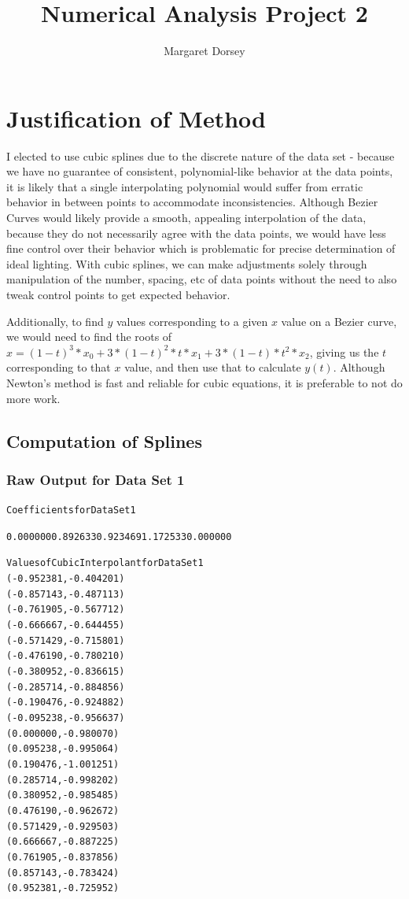 \documentclass[11pt]{article} %
\title{Numerical Analysis Project 2}
\author{Margaret Dorsey}
\begin{document}
\maketitle

\section*{Justification of Method}
	I elected to use cubic splines due to the discrete nature of the data set - because we have no guarantee of consistent, polynomial-like behavior at the data points, it is likely that a single interpolating polynomial would suffer from erratic behavior in between points to accommodate inconsistencies. Although Bezier Curves would likely provide a smooth, appealing interpolation of the data, because they do not necessarily agree with the data points, we would have less fine control over their behavior which is problematic for precise determination of ideal lighting. With  cubic splines, we can make adjustments solely through manipulation of the number, spacing, etc of data points without the need to also tweak control points to get expected behavior.
\par Additionally, to find $y$ values corresponding to a given $x$ value on a Bezier curve, we would need to find the roots of $x = (1-t)^3*x_0 + 3*(1-t)^2*t*x_1 + 3*(1-t)*t^2*x_2$, giving us the $t$ corresponding to that $x$ value, and then use that to calculate $y(t)$. Although Newton's method is fast and reliable for cubic equations, it is preferable to not do more work.

\subsection*{Computation of Splines}
\subsubsection*{Raw Output for Data Set 1}
\begin{alltt}
Coefficients for Data Set 1

0.000000	0.892633	0.923469	1.172533	0.000000	

 Values of Cubic Interpolant for Data Set 1
(-0.952381, -0.404201)
(-0.857143, -0.487113)
(-0.761905, -0.567712)
(-0.666667, -0.644455)
(-0.571429, -0.715801)
(-0.476190, -0.780210)
(-0.380952, -0.836615)
(-0.285714, -0.884856)
(-0.190476, -0.924882)
(-0.095238, -0.956637)
(0.000000, -0.980070)
(0.095238, -0.995064)
(0.190476, -1.001251)
(0.285714, -0.998202)
(0.380952, -0.985485)
(0.476190, -0.962672)
(0.571429, -0.929503)
(0.666667, -0.887225)
(0.761905, -0.837856)
(0.857143, -0.783424)
(0.952381, -0.725952)
\end{alltt}
\end{document}
